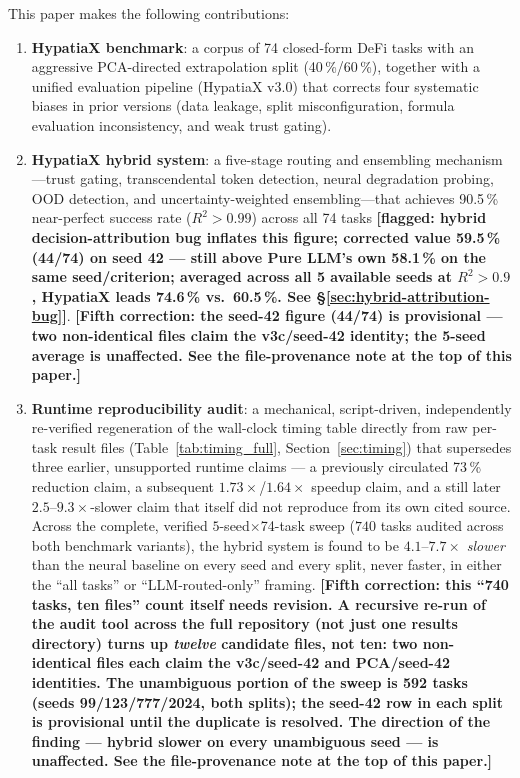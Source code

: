 \documentclass[twoside,11pt]{article}
\newcommand{\Rsq}{R^{2}}
\begin{document}
This paper makes the following contributions:

\begin{enumerate}[leftmargin=2em,label=(\roman*)]
  \item \textbf{HypatiaX benchmark}: a corpus of 74 closed-form DeFi tasks
    with an aggressive PCA-directed extrapolation split (40\,\%/60\,\%), together
    with a unified evaluation pipeline (HypatiaX v3.0) that corrects four
    systematic biases in prior versions (data leakage, split misconfiguration,
    formula evaluation inconsistency, and weak trust gating).

  \item \textbf{HypatiaX hybrid system}: a five-stage routing and ensembling
    mechanism---trust gating, transcendental token detection, neural degradation
    probing, OOD detection, and uncertainty-weighted ensembling---that achieves
    90.5\,\% near-perfect success rate ($\Rsq>0.99$) across all 74 tasks
    \textbf{[flagged: hybrid decision-attribution bug inflates this figure;
    corrected value 59.5\,\% (44/74) on seed 42 --- still above Pure LLM's
    own 58.1\,\% on the same seed/criterion; averaged across all 5
    available seeds at $\Rsq>0.9$, HypatiaX leads 74.6\,\% vs.\ 60.5\,\%.
    See \S\ref{sec:hybrid-attribution-bug}]}. \textbf{[Fifth correction:
    the seed-42 figure (44/74) is provisional --- two non-identical files
    claim the v3c/seed-42 identity; the 5-seed average is unaffected. See
    the file-provenance note at the top of this paper.]}

  \item \textbf{Runtime reproducibility audit}: a mechanical, script-driven,
    independently re-verified regeneration of the wall-clock timing table
    directly from raw per-task result files (Table~\ref{tab:timing_full},
    Section~\ref{sec:timing}) that supersedes three earlier, unsupported
    runtime claims --- a previously circulated 73\,\% reduction claim, a
    subsequent $1.73\times$/$1.64\times$ speedup claim, and a still later
    $2.5$--$9.3\times$-slower claim that itself did not reproduce from its
    own cited source. Across the complete, verified $5$-seed$\times$74-task
    sweep ($740$ tasks audited across both benchmark variants), the hybrid
    system is found to be $4.1$--$7.7\times$ \emph{slower} than the neural
    baseline on every seed and every split, never faster, in either the
    ``all tasks'' or ``LLM-routed-only'' framing. \textbf{[Fifth
    correction: this ``740 tasks, ten files'' count itself needs revision.
    A recursive re-run of the audit tool across the full repository (not
    just one results directory) turns up \emph{twelve} candidate files, not
    ten: two non-identical files each claim the v3c/seed-42 and
    PCA/seed-42 identities. The unambiguous portion of the sweep is 592
    tasks (seeds 99/123/777/2024, both splits); the seed-42 row in each
    split is provisional until the duplicate is resolved. The
    direction of the finding --- hybrid slower on every unambiguous seed
    --- is unaffected. See the file-provenance note at the top of this
    paper.]}


\end{enumerate}
\end{document}
